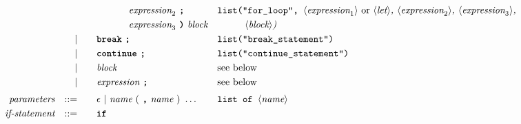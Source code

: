 \begin{alignat*}{9}
&&                       &&     &\quad && \ \ \ \ \ \ \ \ \ \ \textit{expression}_2 \ \textbf{\texttt{;}} && \texttt{list("for\_loop",  } \langle \textit{expression}_1\rangle\ \textrm{or}\ \langle \textit{let}\rangle \textit{,  } \langle \textit{expression}_2\rangle \textit{,  } \langle \textit{expression}_3\rangle \textit{,}\\
&&                       &&     &\quad && \ \ \ \ \ \ \ \ \ \ \textit{expression}_3 \ \textbf{\texttt{)}} \  \textit{block}
                                            && \texttt{ }\ \ \ \ \ \ \ \langle \textit{block}\rangle \textit{)} \\
&&                       && |   &\quad && \textbf{\texttt{break}}\ \textbf{\texttt{;}}
                                                           && \texttt{list("break\_statement")} \\
&&                       && |   &\quad && \textbf{\texttt{continue}}\ \textbf{\texttt{;}}
                                                           && \texttt{list("continue\_statement")} \\
&&                       && |   &\quad &&  \textit{block}
                                                           && \textrm{see below}\\
&&                       && |   &\quad &&  \textit{expression} \ \textbf{\texttt{;}}
                                                           && \textrm{see below}\\[1mm]
&& \textit{parameters}   && ::= &\quad &&  \epsilon\ | \  \textit{name} \
                                                   (\ \textbf{\texttt{,}} \ \textit{name}\ )\ \ldots
                                                            && \texttt{list of  } \langle \textit{name}\rangle  \\
&& \textit{if-statement} && ::= &\quad &&  \textbf{\texttt{if}}\

\end{alignat*}
